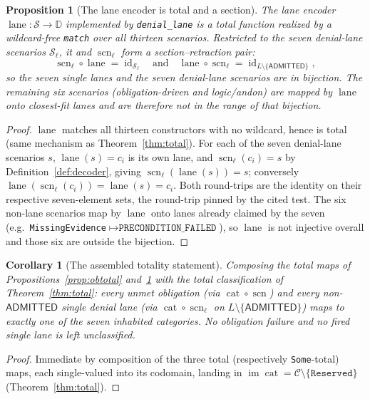 \documentclass[11pt,oneside]{book}
\theoremstyle{definition}
\theoremstyle{plain}
\newtheorem{proposition}[theorem]{Proposition}
\newtheorem{corollary}[theorem]{Corollary}
\theoremstyle{remark}
\DeclareMathOperator{\im}{im}
\DeclareMathOperator{\id}{id}
\newcommand{\code}[1]{\texttt{#1}}
\newcommand{\Deny}{\mathbb{D}}                 %
\newcommand{\Adml}{\mathsf{ADMITTED}}          %
\newcommand{\Catset}{\mathcal{C}}              %
\newcommand{\Scnset}{\mathcal{S}}              %
\DeclareMathOperator{\catop}{cat}
\DeclareMathOperator{\laneop}{lane}
\DeclareMathOperator{\scnop}{scn}
\begin{document}
\begin{proposition}[The lane encoder is total and a section]\label{prop:section}
The \emph{lane encoder} $\laneop:\Scnset\to\Deny$ implemented by \code{denial\_lane} is a total
function realized by a wildcard-free \code{match} over all thirteen scenarios. Restricted to
the seven denial-lane scenarios $\Scnset_\ell$, it and $\scnop_\ell$ form a section--retraction
pair:
\[
\scnop_\ell\circ\laneop=\id_{\Scnset_\ell}\quad\text{and}\quad
\laneop\circ\scnop_\ell=\id_{L\setminus\{\Adml\}},
\]
so the seven single lanes and the seven denial-lane scenarios are in bijection. The remaining
six scenarios (obligation-driven and logic/andon) are mapped by $\laneop$ onto \emph{closest-fit}
lanes and are therefore not in the range of that bijection.
\end{proposition}

\begin{proof}
$\laneop$ matches all thirteen constructors with no wildcard, hence is total (same mechanism as
Theorem~\ref{thm:total}). For each of the seven denial-lane scenarios $s$, $\laneop(s)=c_i$ is
its own lane, and $\scnop_\ell(c_i)=s$ by Definition~\ref{def:decoder}, giving
$\scnop_\ell(\laneop(s))=s$; conversely $\laneop(\scnop_\ell(c_i))=\laneop(s)=c_i$. Both
round-trips are the identity on their respective seven-element sets, the round-trip pinned by
the cited test. The six non-lane scenarios map by $\laneop$ onto lanes already claimed by the
seven (e.g.\ \code{MissingEvidence}$\mapsto\code{PRECONDITION\_FAILED}$), so $\laneop$ is not
injective overall and those six are outside the bijection. \end{proof}

\begin{corollary}[The assembled totality statement]\label{cor:assembled}
Composing the total maps of Propositions~\ref{prop:obtotal} and~\ref{prop:section} with the
total classification of Theorem~\ref{thm:total}: \emph{every unmet obligation} (via
$\catop\circ\scnop$) and \emph{every non-}$\Adml$\emph{ single denial lane} (via
$\catop\circ\scnop_\ell$ on $L\setminus\{\Adml\}$) maps to exactly one of the seven inhabited
categories. No obligation failure and no fired single lane is left unclassified.
\end{corollary}

\begin{proof}
Immediate by composition of the three total (respectively \code{Some}-total) maps, each
single-valued into its codomain, landing in $\im\catop=\Catset\setminus\{\code{Reserved}\}$
(Theorem~\ref{thm:total}). \end{proof}
\end{document}
